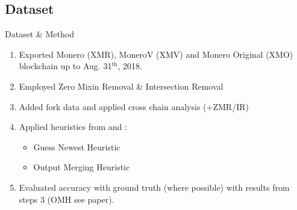 


\subsection{Dataset}
\begin{frame}{Dataset \& Method}
	\begin{enumerate}
		\item Exported Monero (XMR), MoneroV (XMV) and Monero Original (XMO) blockchain up to Aug. 31$^\text{th}$, 2018.
		\item Employed Zero Mixin Removal \& Intersection Removal
		\item Added fork data and applied cross chain analysis (+ZMR/IR)
		\item Applied heuristics from \cite{kumar_traceability_2017} and \cite{moser_empirical_2018}:
		\begin{itemize}
			\item Guess Newest Heuristic
			\item Output Merging Heuristic
		\end{itemize}
		\item Evaluated accuracy with ground truth (where possible) with results from steps 3 (OMH see paper).
	\end{enumerate}
\end{frame}

